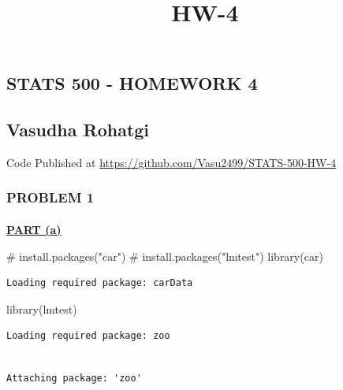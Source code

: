 \documentclass[
  11pt,
]{article}
\title{HW-4}
\author{}
\date{}
\makeatletter
\let\oldparagraph\paragraph
\renewcommand{\paragraph}{
    \@ifstar
      \xxxParagraphStar
      \xxxParagraphNoStar
  }
\newcommand{\xxxParagraphStar}[1]{\oldparagraph*{#1}\mbox{}}
\newcommand{\xxxParagraphNoStar}[1]{\oldparagraph{#1}\mbox{}}
\newenvironment{Shaded}{\begin{snugshade}}{\end{snugshade}}
\newcommand{\CommentTok}[1]{\textcolor[rgb]{0.37,0.37,0.37}{#1}}
\newcommand{\FunctionTok}[1]{\textcolor[rgb]{0.28,0.35,0.67}{#1}}
\newcommand{\NormalTok}[1]{\textcolor[rgb]{0.00,0.23,0.31}{#1}}
\makeatother
\begin{document}
\maketitle


\subsection{STATS 500 - HOMEWORK 4}\label{stats-500---homework-4}

\subsection{Vasudha Rohatgi}\label{vasudha-rohatgi}

Code Published at \url{https://github.com/Vasu2499/STATS-500-HW-4}

\subsubsection{PROBLEM 1}\label{problem-1}

\paragraph{\texorpdfstring{\ul{\textbf{PART
(a)}}}{PART (a)}}\label{part-a}

\begin{Shaded}
\begin{Highlighting}[]
\CommentTok{\# install.packages("car")}
\CommentTok{\# install.packages("lmtest")}
\FunctionTok{library}\NormalTok{(car)}
\end{Highlighting}
\end{Shaded}

\begin{verbatim}
Loading required package: carData
\end{verbatim}

\begin{Shaded}
\begin{Highlighting}[]
\FunctionTok{library}\NormalTok{(lmtest)}
\end{Highlighting}
\end{Shaded}

\begin{verbatim}
Loading required package: zoo
\end{verbatim}

\begin{verbatim}

Attaching package: 'zoo'
\end{verbatim}
\end{document}
